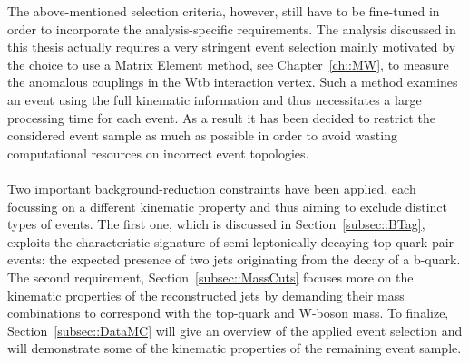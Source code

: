 The above-mentioned selection criteria, however, still have to be fine-tuned in order to incorporate the analysis-specific requirements.
The analysis discussed in this thesis actually requires a very stringent event selection mainly motivated by the choice to use a Matrix Element method, see Chapter~\ref{ch::MW}, to measure the anomalous couplings in the Wtb interaction vertex. Such a method examines an event using the full kinematic information and thus necessitates a large processing time for each event. As a result it has been decided to restrict the considered event sample as much as possible in order to avoid wasting computational resources on incorrect event topologies.
\\
\\
Two important background-reduction constraints have been applied, each focussing on a different kinematic property and thus aiming to exclude distinct types of events. 
The first one, which is discussed in Section~\ref{subsec::BTag}, exploits the characteristic signature of semi-leptonically decaying top-quark pair events: the expected presence of two jets originating from the decay of a b-quark. The second requirement, Section~\ref{subsec::MassCuts} focuses more on the kinematic properties of the reconstructed jets by demanding their mass combinations to correspond with the top-quark and W-boson mass.
To finalize, Section~\ref{subsec::DataMC} will give an overview of the applied event selection and will demonstrate some of the kinematic properties of the remaining event sample.



